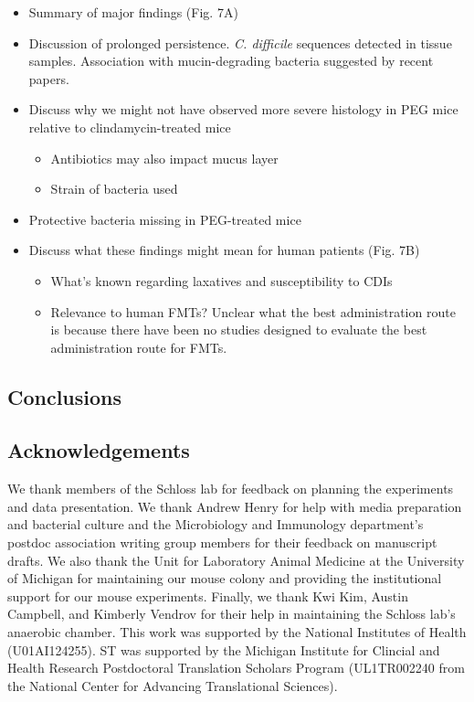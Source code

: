 \documentclass[
  11pt,
]{article}
\providecommand{\tightlist}{%
  \setlength{\itemsep}{0pt}\setlength{\parskip}{0pt}}
\begin{document}
\begin{itemize}
\item
  Summary of major findings (Fig. 7A)
\item
  Discussion of prolonged persistence. \emph{C. difficile} sequences
  detected in tissue samples. Association with mucin-degrading bacteria
  suggested by recent papers.
\item
  Discuss why we might not have observed more severe histology in PEG
  mice relative to clindamycin-treated mice

  \begin{itemize}
  \tightlist
  \item
    Antibiotics may also impact mucus layer
  \item
    Strain of bacteria used
  \end{itemize}
\item
  Protective bacteria missing in PEG-treated mice
\item
  Discuss what these findings might mean for human patients (Fig. 7B)

  \begin{itemize}
  \tightlist
  \item
    What's known regarding laxatives and susceptibility to CDIs
  \item
    Relevance to human FMTs? Unclear what the best administration route
    is because there have been no studies designed to evaluate the best
    administration route for FMTs.
  \end{itemize}
\end{itemize}

\hypertarget{conclusions}{%
\subsection{Conclusions}\label{conclusions}}

\hypertarget{acknowledgements}{%
\subsection{Acknowledgements}\label{acknowledgements}}

We thank members of the Schloss lab for feedback on planning the
experiments and data presentation. We thank Andrew Henry for help with
media preparation and bacterial culture and the Microbiology and
Immunology department's postdoc association writing group members for
their feedback on manuscript drafts. We also thank the Unit for
Laboratory Animal Medicine at the University of Michigan for maintaining
our mouse colony and providing the institutional support for our mouse
experiments. Finally, we thank Kwi Kim, Austin Campbell, and Kimberly
Vendrov for their help in maintaining the Schloss lab's anaerobic
chamber. This work was supported by the National Institutes of Health
(U01AI124255). ST was supported by the Michigan Institute for Clincial
and Health Research Postdoctoral Translation Scholars Program
(UL1TR002240 from the National Center for Advancing Translational
Sciences).
\end{document}
